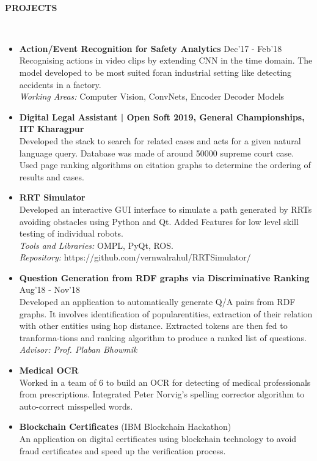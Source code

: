 \documentclass[a4paper,8pt]{article}
\newcommand{\lsep}{-0.5cm}
\newcommand{\resheading}[1]{{\small \colorbox{mygrey}{\begin{minipage}{0.975\textwidth}{\textbf{#1 \vphantom{p\^{E}}}}\end{minipage}}}}
\begin{document}
\hspace{0.5cm}\\[-0.2cm]
\resheading{\textbf{PROJECTS} }\\[\lsep]
\begin{itemize}

\item \textbf{Action/Event Recognition for Safety Analytics} \hfill \small{Dec'17 - Feb'18} \\
\small{Recognising actions in video clips by extending CNN in the time domain.  The model developed to be most suited foran industrial setting like detecting accidents in a factory.}\\
\textit{Working Areas:} \small{ Computer Vision, ConvNets, Encoder Decoder Models }

\item \textbf{Digital Legal Assistant | Open Soft 2019, General Championships, IIT Kharagpur} \\
\small{Developed the stack to search for related cases and acts for a given natural language query. Database was made of around 50000 supreme court case. Used
page ranking algorithms on citation graphs to determine the ordering of results and cases.}

\item \textbf{RRT Simulator} \\
\small{Developed an interactive GUI interface to simulate a path generated by RRTs avoiding obstacles using Python and Qt. Added Features for low level skill testing of individual robots.}\\
\textit{Tools and Libraries:} \small{OMPL, PyQt, ROS.}\\
\textit{Repository:} \small{{https://github.com/vernwalrahul/RRTSimulator/}} 

\item \textbf{Question Generation from RDF graphs via Discriminative Ranking} \hfill \small{Aug'18 - Nov'18} \\
\small{Developed an application to automatically generate Q/A pairs from RDF graphs.  It involves identification of popularentities, extraction of their relation with other entities using hop distance.  Extracted tokens are then fed to tranforma-tions and ranking algorithm to produce a ranked list of questions.}\\
\textit{Advisor: Prof. Plaban Bhowmik}

\item \textbf{Medical OCR} \hspace{0.5cm} \\
\small{Worked in a team of 6 to build an OCR for detecting of medical professionals from prescriptions. Integrated Peter Norvig's spelling corrector algorithm to auto-correct misspelled words.} 
	
\item \textbf{Blockchain Certificates} (IBM Blockchain Hackathon) \\
\small{An application on digital certificates using blockchain technology to avoid fraud certificates and speed up the verification process.} 
\end{itemize}
\end{document}
